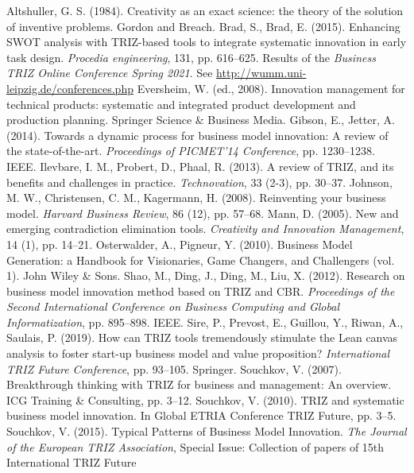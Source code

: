 \documentclass[11pt,a4paper]{article}
\begin{document}
\begin{thebibliography}{xxx}
 Altshuller, G. S. (1984). Creativity as an exact science: the
  theory of the solution of inventive problems. Gordon and Breach.
 Brad, S., Brad, E. (2015). Enhancing SWOT analysis with
  TRIZ-based tools to integrate systematic innovation in early task design.
  \emph{Procedia engineering}, 131, pp. 616--625.
 Results of the \emph{Business TRIZ Online Conference Spring 2021}.
  See \url{http://wumm.uni-leipzig.de/conferences.php}
 Eversheim, W. (ed., 2008). Innovation management for technical
  products: systematic and integrated product development and production
  planning. Springer Science \& Business Media.
 Gibson, E., Jetter, A. (2014). Towards a dynamic process for
  business model innovation: A review of the state-of-the-art.
  \emph{Proceedings of PICMET'14 Conference}, pp. 1230--1238.  IEEE.
 Ilevbare, I. M., Probert, D., Phaal, R. (2013). A review of TRIZ,
  and its benefits and challenges in practice. \emph{Technovation}, 33 (2-3),
  pp. 30--37.
 Johnson, M. W., Christensen, C. M., Kagermann, H. (2008).
  Reinventing your business model. \emph{Harvard Business Review}, 86 (12),
  pp. 57--68.
 Mann, D. (2005). New and emerging contradiction elimination tools.
  \emph{Creativity and Innovation Management}, 14 (1), pp. 14--21.
 Osterwalder, A., Pigneur, Y. (2010). Business Model Generation: a
  Handbook for Visionaries, Game Changers, and Challengers (vol. 1). John
  Wiley \& Sons.
 Shao, M., Ding, J., Ding, M., Liu, X. (2012). Research on
  business model innovation method based on TRIZ and CBR. \emph{Proceedings of
    the Second International Conference on Business Computing and Global
    Informatization}, pp. 895--898. IEEE.
 Sire, P., Prevost, E., Guillou, Y., Riwan, A., Saulais, P.
  (2019).  How can TRIZ tools tremendously stimulate the Lean canvas analysis
  to foster start-up business model and value proposition? \emph{International
    TRIZ Future Conference}, pp. 93--105. Springer.
 Souchkov, V. (2007). Breakthrough thinking with TRIZ for business
  and management: An overview. ICG Training \& Consulting, pp. 3--12.
 Souchkov, V. (2010). TRIZ and systematic business model
  innovation.  In Global ETRIA Conference TRIZ Future, pp. 3--5.
 Souchkov, V. (2015). Typical Patterns of Business Model
  Innovation. \emph{The Journal of the European TRIZ Association}, Special
  Issue: Collection of papers of 15th International TRIZ Future

\end{thebibliography}
\end{document}
